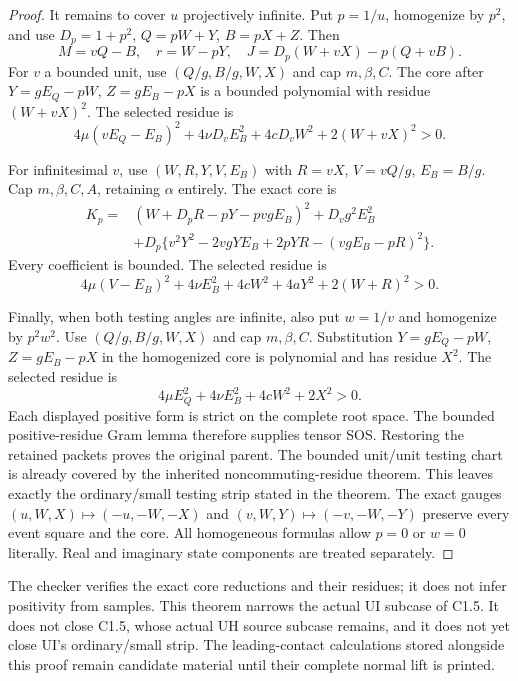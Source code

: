\begin{proof}
It remains to cover $u$ projectively infinite. Put $p=1/u$,
homogenize by $p^2$, and use $D_p=1+p^2$,
$Q=pW+Y$, $B=pX+Z$. Then
\[
 M=vQ-B,\quad r=W-pY,\quad
 J=D_p(W+vX)-p(Q+vB).                              \tag{CR9}
\]
For $v$ a bounded unit, use $(Q/g,B/g,W,X)$ and cap $m,\beta,C$.
The core after $Y=gE_Q-pW$, $Z=gE_B-pX$ is a bounded polynomial
with residue $(W+vX)^2$. The selected residue is
\[
 4\mu(vE_Q-E_B)^2+4\nu D_vE_B^2
           +4cD_vW^2+2(W+vX)^2>0.                 \tag{CR10}
\]

For infinitesimal $v$, use $(W,R,Y,V,E_B)$ with
$R=vX$, $V=vQ/g$, $E_B=B/g$. Cap $m,\beta,C,A$, retaining
$\alpha$ entirely. The exact core is
\begin{align*}
K_p={}&(W+D_pR-pY-pvgE_B)^2+D_vg^2E_B^2\\
 &+D_p\{v^2Y^2-2vgYE_B+2pYR-(vgE_B-pR)^2\}.
                                                               \tag{CR11}
\end{align*}
Every coefficient is bounded. The selected residue is
\[
 4\mu(V-E_B)^2+4\nu E_B^2+4cW^2+4aY^2
                    +2(W+R)^2>0.                 \tag{CR12}
\]

Finally, when both testing angles are infinite, also put $w=1/v$
and homogenize by $p^2w^2$. Use $(Q/g,B/g,W,X)$ and cap
$m,\beta,C$. Substitution $Y=gE_Q-pW$, $Z=gE_B-pX$ in the
homogenized core is polynomial and has residue $X^2$.
The selected residue is
\[
 4\mu E_Q^2+4\nu E_B^2+4cW^2+2X^2>0.               \tag{CR13}
\]
Each displayed positive form is strict on the complete root space.
The bounded positive-residue Gram lemma therefore supplies tensor
SOS. Restoring the retained packets proves the original parent.
The bounded unit/unit testing chart is already covered by the
inherited noncommuting-residue theorem. This leaves exactly the
ordinary/small testing strip stated in the theorem. The exact gauges
$(u,W,X)\mapsto(-u,-W,-X)$ and
$(v,W,Y)\mapsto(-v,-W,-Y)$ preserve every event square and the core.
All homogeneous formulas allow $p=0$ or $w=0$ literally.
Real and imaginary state components are treated separately.
\end{proof}

The checker verifies the exact core reductions and their residues;
it does not infer positivity from samples. This theorem narrows the
actual UI subcase of C1.5. It does not close C1.5, whose actual UH
source subcase remains, and it does not yet close UI's ordinary/small
strip. The leading-contact calculations stored alongside this proof
remain candidate material until their complete normal lift is printed.
